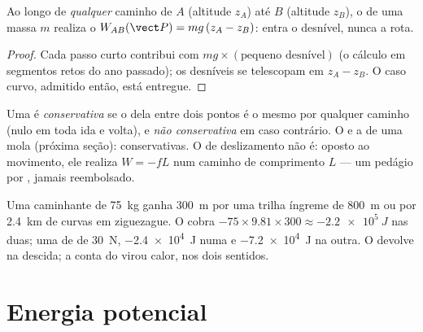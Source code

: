 \begin{proposition}\label{prop:g12:work-and-energy:weight}
Ao longo de \emph{qualquer} caminho de $A$ (altitude $z_A$) até $B$ (altitude $z_B$), o
 de uma massa $m$ realiza o  $W_{AB}(\vect P) = mg\,(z_A - z_B)$: entra o
desnível, nunca a rota.
\end{proposition}

\begin{proof}
Cada passo curto contribui com $mg \times (\text{pequeno desnível})$ (o cálculo em
segmentos retos do ano passado); os desníveis se telescopam em $z_A - z_B$. O caso
curvo, admitido então, está entregue.
\end{proof}

\begin{definition}\label{def:g12:work-and-energy:conservative}
Uma  é \emph{conservativa} se o  dela entre dois
pontos é o mesmo por qualquer caminho (nulo em toda ida e volta), e
\emph{não conservativa} em caso contrário. O  e a
 de uma mola (próxima seção): conservativas. O  de deslizamento não é:
oposto ao movimento, ele realiza $W = -fL$ num caminho de comprimento $L$ --- um
pedágio por , jamais reembolsado.
\end{definition}

\begin{example}\label{ex:g12:work-and-energy:trails}
Uma caminhante de \qty{75}{kg} ganha \qty{300}{m} por uma trilha íngreme de
\qty{800}{m} ou por \qty{2.4}{km} de curvas em ziguezague. O  cobra
$-75 \times 9.81 \times 300 \approx \qty{-2.2e5}{J}$ nas duas; uma  de  de
\qty{30}{N}, \qty{-2.4e4}{J} numa e \qty{-7.2e4}{J} na outra. O  devolve na
descida; a conta do  virou calor, nos dois sentidos.
\end{example}

\section{Energia potencial}

